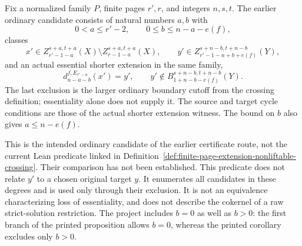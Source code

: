 \begin{definition}
  \label{def:finite-page-extension-ordinary-crossing-candidate}
  \notready
  Fix a normalized family $P$, finite pages $r',r$, and integers $n,s,t$.
  The earlier ordinary candidate consists of natural numbers $a,b$ with
  \[
    0<a\le r'-2,\qquad 0\le b\le n-a-e(f),
  \]
  classes
  \[
    x'\in Z_{r'-1-a}^{s+a,t+a}(X)
       \setminus Z_{r-1-a}^{s+a,t+a}(X),\qquad
    y'\in Z_{r'-1-n+b+e(f)}^{s+n-b,t+n-b}(Y),
  \]
  and an actual essential shorter extension in the same family,
  \[
    d_{n-a-b}^{f,E_{r'-a}}(x')=y',\qquad
    y'\notin B_{1+n-b-e(f)}^{s+n-b,t+n-b}(Y).
  \]
  The last exclusion is the larger ordinary boundary cutoff from the
  crossing definition; essentiality alone does not supply it.
  The source and target cycle conditions are those of the actual shorter
  extension witness.  The bound on $b$ also gives $a\le n-e(f)$.

  This is the intended ordinary candidate of the earlier certificate route,
  not the current Lean predicate linked in
  Definition~\ref{def:finite-page-extension-nonliftable-crossing}.
  Their comparison has not been established.
  This predicate does not relate $y'$ to a chosen original target $y$.
  It enumerates all candidates in these degrees and is used only through
  their exclusion.  It is not an equivalence characterizing loss of
  essentiality, and does not describe the cokernel of a raw strict-solution
  restriction.  The project includes $b=0$ as well as $b>0$: the first
  branch of the printed proposition allows $b=0$, whereas the printed
  corollary excludes only $b>0$.
\end{definition}

